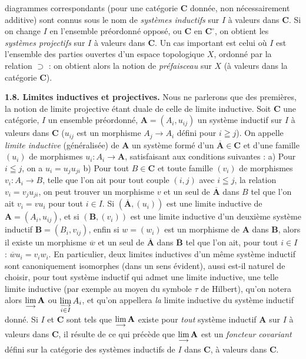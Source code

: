 
\noindent diagrammes correspondants (pour une catégorie $\mathbf{C}$ donnée, non
nécessairement additive) sont connus sous le nom de \textit{systèmes
inductifs} sur $I$ à valeurs dans $\mathbf{C}$. Si on change $I$ en l'ensemble
préordonné opposé, ou $\mathbf{C}$ en $\mathbf{C}^\circ$, on obtient les \textit{systèmes
projectifs} sur $I$ à valeurs dans $\mathbf{C}$. Un cas important est celui où $I$ est
l'ensemble des parties ouvertes d'un espace topologique $X$, ordonné par la
relation $\supset$ : on obtient alors la notion de \textit{préfaisceau} sur
$X$ (à valeurs dans la catégorie $\mathbf{C}$).

\textbf{1.8. Limites inductives et projectives.} Nous ne parlerons
que des premières, la notion de limite projective étant duale de celle de
limite inductive. Soit $\mathbf{C}$ une catégorie, $I$ un ensemble préordonné,
$\mathbf A=(A_i,u_{ij})$ un système inductif sur $I$ à valeurs dans $\mathbf{C}$
($u_{ij}$ est un morphisme $A_j\to A_i$ défini pour $i\geqq j$).
On appelle \textit{limite inductive} (généralisée) de $\mathbf A$ un système
formé d'un $\overline{\mathbf A}\in \mathbf{C}$ et d'une famille $(u_i)$ de morphismes
$u_i:A_i\to\mathbf A$, satisfaisant aux conditions suivantes :
a) Pour $i\leqq j$, on a $u_i=u_j u_{ji}$ b) Pour tout $B\in \mathbf{C}$ et toute
famille $(v_i)$ de morphismes $v_i:A_i\to B$, telle que l'on ait
pour tout couple $(i,j)$ avec $i\leqq j$, la relation $v_i=v_j u_{ji}$, on peut
trouver un morphisme $v$ et un seul de $\overline{\mathbf A}$ dans $B$ tel que l'on ait
$v_i=v u_i$ pour tout $i\in I$.
Si $(\overline{\mathbf A},(u_i))$ est une limite inductive de
$\mathbf A=(A_i,u_{ij})$, et si $(\mathbf B,(v_i))$ est une limite inductive
d'un deuxième système inductif $\mathbf B=(B_i,v_{ij})$, enfin si
$w=(w_i)$ est un morphisme de $\mathbf A$ dans $\mathbf B$, alors il existe un
morphisme $\overline w$ et un seul de $\overline{\mathbf A}$ dans $\overline{\mathbf B}$ tel que
l'on ait, pour tout $i\in I$ : $\overline w u_i=v_iw_i$. En particulier, deux
limites inductives d'un même système inductif sont canoniquement isomorphes
(dans un sens évident), aussi est-il naturel de choisir, pour tout système
inductif qui admet une limite inductive, une telle limite inductive (par
exemple au moyen du symbole $\tau$ de Hilbert), qu'on notera alors
$\mathop{\rm lim}\limits_{\longrightarrow}\mathbf A$ ou
$\mathop{\rm lim}\limits_{\substack{\longrightarrow\\i\in I}}A_i$, et qu'on
appellera \textit{la} limite inductive du système inductif donné.
Si $I$ et $\mathbf{C}$ sont tels que
$\mathop{\rm lim}\limits_{\longrightarrow}\mathbf A$ existe pour
\textit{tout} système inductif $\mathbf A$ sur $I$ à valeurs dans $\mathbf{C}$, il
résulte de ce qui précède que
$\mathop{\rm lim}\limits_{\longrightarrow}\mathbf A$ est un \textit{foncteur
covariant} défini sur la catégorie des systèmes inductifs de $I$ dans $\mathbf{C}$, à
valeurs dans $\mathbf{C}$.

